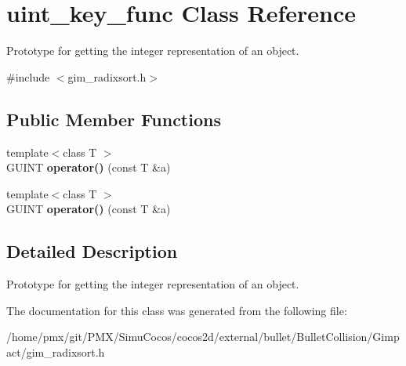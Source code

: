 \hypertarget{classuint__key__func}{}\section{uint\+\_\+key\+\_\+func Class Reference}
\label{classuint__key__func}


Prototype for getting the integer representation of an object.  




{\ttfamily \#include $<$gim\+\_\+radixsort.\+h$>$}

\subsection*{Public Member Functions}
\begin{DoxyCompactItemize}
\item 
\mbox{\label{classuint__key__func_ada049ee7335acea315ab815356cf8577}} 
{\footnotesize template$<$class T $>$ }\\G\+U\+I\+NT {\bfseries operator()} (const T \&a)
\item 
\mbox{\label{classuint__key__func_ada049ee7335acea315ab815356cf8577}} 
{\footnotesize template$<$class T $>$ }\\G\+U\+I\+NT {\bfseries operator()} (const T \&a)
\end{DoxyCompactItemize}


\subsection{Detailed Description}
Prototype for getting the integer representation of an object. 

The documentation for this class was generated from the following file\+:\begin{DoxyCompactItemize}
\item 
/home/pmx/git/\+P\+M\+X/\+Simu\+Cocos/cocos2d/external/bullet/\+Bullet\+Collision/\+Gimpact/gim\+\_\+radixsort.\+h\end{DoxyCompactItemize}
